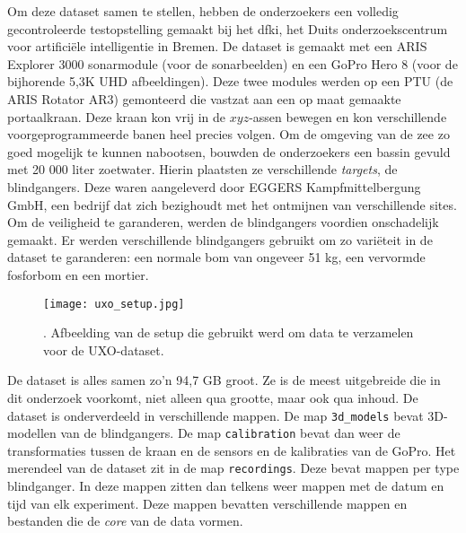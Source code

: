 Om deze dataset samen te stellen, hebben de onderzoekers een volledig gecontroleerde testopstelling gemaakt bij het \gls{dfki}, het Duits onderzoekscentrum voor artificiële intelligentie in Bremen. De dataset is gemaakt met een ARIS Explorer 3000 sonarmodule (voor de sonarbeelden) en een GoPro Hero 8 (voor de bijhorende 5,3K UHD afbeeldingen). Deze twee modules werden op een \gls{PTU} (de ARIS Rotator AR3) gemonteerd die vastzat aan een op maat gemaakte \gls{portaalkraan}. Deze kraan kon vrij in de $xyz$-assen bewegen en kon verschillende voorgeprogrammeerde banen heel precies volgen. Om de omgeving van de zee zo goed mogelijk te kunnen nabootsen, bouwden de onderzoekers een bassin gevuld met 20 000 liter zoetwater. Hierin plaatsten ze verschillende \emph{targets}, de \glspl{blindganger}. Deze waren aangeleverd door EGGERS Kampfmittelbergung GmbH, een bedrijf dat zich bezighoudt met het ontmijnen van verschillende sites. Om de veiligheid te garanderen, werden de \glspl{blindganger} voordien onschadelijk gemaakt. Er werden verschillende \glspl{blindganger} gebruikt om zo variëteit in de dataset te garanderen: een normale bom van ongeveer 51 kg, een vervormde fosforbom en een mortier. \autocite{Dahn_2024}

\begin{figure}[H]
    \centering
    \texttt{[image: uxo\_setup.jpg]}
    \caption[Setup waarmee de UXO-dataset gemaakt is]{\label{fig:uxo_setup}. Afbeelding van de setup die gebruikt werd om data te verzamelen voor de UXO-dataset. \autocite{Dahn_2024_UXO}}
\end{figure}

De dataset is alles samen zo'n 94,7 GB groot. Ze is de meest uitgebreide die in dit onderzoek voorkomt, niet alleen qua grootte, maar ook qua inhoud. De dataset is onderverdeeld in verschillende mappen. De map \texttt{3d\_models} bevat 3D-modellen van de \glspl{blindganger}. De map \texttt{calibration} bevat dan weer de transformaties tussen de kraan en de sensors en de kalibraties van de GoPro. Het merendeel van de dataset zit in de map \texttt{recordings}. Deze bevat mappen per type \gls{blindganger}. In deze mappen zitten dan telkens weer mappen met de datum en tijd van elk experiment. Deze mappen bevatten verschillende mappen en bestanden die de \emph{core} van de data vormen. \autocite{Dahn_2024_UXO}

\clearpage


